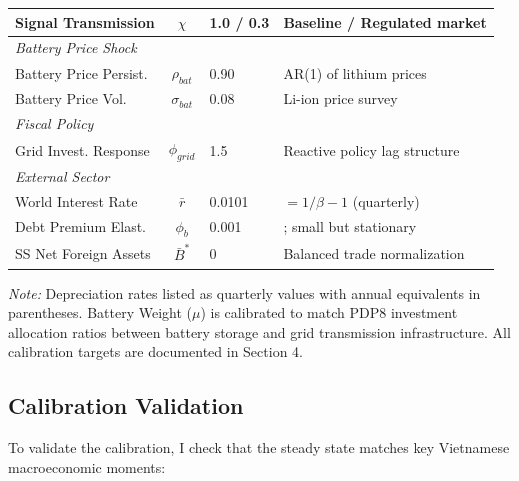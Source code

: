 \documentclass[12pt, a4paper]{article}
\begin{document}
\begin{table}[H]
\begin{tabular}{l c l p{6.5cm}}
        Signal Transmission & $\chi$ & 1.0 / 0.3 & Baseline / Regulated market \\
        \midrule
        \multicolumn{4}{l}{\textit{Battery Price Shock}} \\
        Battery Price Persist. & $\rho_{bat}$ & 0.90 & AR(1) of lithium prices \citep{bloombergnef2023} \\
        Battery Price Vol. & $\sigma_{bat}$ & 0.08 & \citet{bloombergnef2023} Li-ion price survey \\
        \midrule
        \multicolumn{4}{l}{\textit{Fiscal Policy}} \\
        Grid Invest. Response & $\phi_{grid}$ & 1.5 & Reactive policy lag structure \\
        \midrule
        \multicolumn{4}{l}{\textit{External Sector}} \\
        World Interest Rate & $\bar{r}$ & 0.0101 & $= 1/\beta - 1$ (quarterly) \\
        Debt Premium Elast. & $\phi_b$ & 0.001 & \citet{schmittgrohe2003}; small but stationary \\
        SS Net Foreign Assets & $\bar{B}^*$ & 0 & Balanced trade normalization \\
        \bottomrule
    \end{tabular}
    \vspace{0.2cm}
    \parbox{\textwidth}{\footnotesize \textit{Note:} Depreciation rates listed as quarterly values with annual equivalents in parentheses. Battery Weight ($\mu$) is calibrated to match PDP8 investment allocation ratios between battery storage and grid transmission infrastructure. All calibration targets are documented in Section 4.}
\end{table}

\subsection{Calibration Validation}

To validate the calibration, I check that the steady state matches key Vietnamese macroeconomic moments:
\end{document}
